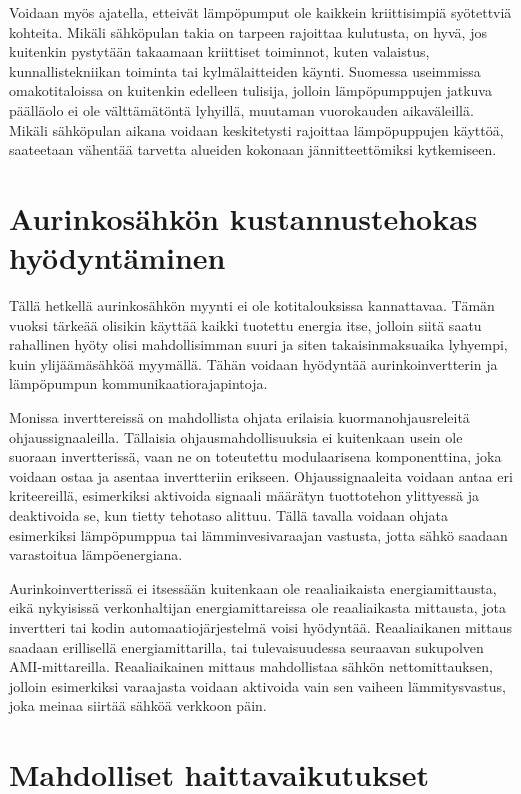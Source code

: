   Voidaan myös ajatella, etteivät lämpöpumput ole kaikkein kriittisimpiä syötettviä kohteita. Mikäli sähköpulan takia on tarpeen rajoittaa kulutusta, on hyvä, jos kuitenkin pystytään takaamaan kriittiset toiminnot, kuten valaistus, kunnallistekniikan toiminta tai kylmälaitteiden käynti. Suomessa useimmissa omakotitaloissa on kuitenkin edelleen tulisija, jolloin lämpöpumppujen jatkuva päälläolo ei ole välttämätöntä lyhyillä, muutaman vuorokauden aikaväleillä. Mikäli sähköpulan aikana voidaan keskitetysti rajoittaa lämpöpuppujen käyttöä, saateetaan vähentää tarvetta alueiden kokonaan jännitteettömiksi kytkemiseen.

\section{Aurinkosähkön kustannustehokas hyödyntäminen}

  Tällä hetkellä aurinkosähkön myynti ei ole kotitalouksissa kannattavaa. Tämän vuoksi tärkeää olisikin käyttää kaikki tuotettu energia itse, jolloin siitä saatu rahallinen hyöty olisi mahdollisimman suuri ja siten takaisinmaksuaika lyhyempi, kuin ylijäämäsähköä myymällä. Tähän voidaan hyödyntää aurinkoinvertterin ja lämpöpumpun kommunikaatiorajapintoja. 

  Monissa inverttereissä on mahdollista ohjata erilaisia kuormanohjausreleitä ohjaussignaaleilla. Tällaisia ohjausmahdollisuuksia ei kuitenkaan usein ole suoraan invertterissä, vaan ne on toteutettu modulaarisena komponenttina, joka voidaan ostaa ja asentaa invertteriin erikseen. Ohjaussignaaleita voidaan antaa eri kriteereillä, esimerkiksi aktivoida signaali määrätyn tuottotehon ylittyessä ja deaktivoida se, kun tietty tehotaso alittuu. Tällä tavalla voidaan ohjata esimerkiksi lämpöpumppua tai lämminvesivaraajan vastusta, jotta sähkö saadaan varastoitua lämpöenergiana. 
  
  Aurinkoinvertterissä ei itsessään kuitenkaan ole reaaliaikaista energiamittausta, eikä nykyisissä verkonhaltijan energiamittareissa ole reaaliaikasta mittausta, jota invertteri tai kodin automaatiojärjestelmä voisi hyödyntää. Reaaliaikanen mittaus saadaan erillisellä energiamittarilla, tai tulevaisuudessa seuraavan sukupolven AMI-mittareilla. Reaaliaikainen mittaus mahdollistaa sähkön nettomittauksen, jolloin esimerkiksi varaajasta voidaan aktivoida vain sen vaiheen lämmitysvastus, joka meinaa siirtää sähköä verkkoon päin.

  \section{Mahdolliset haittavaikutukset}

